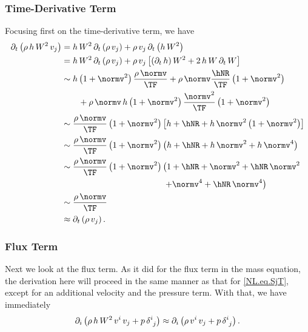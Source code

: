 \subsubsection{Time-Derivative Term}
Focusing first on the time-derivative term, we have
\begin{align}
  \p_{t}\left(\rho\,h\,W^{2}\,v_{j}\right)
  &=h\,W^{2}\,\p_{t}\left(\rho\,v_{j}\right)
  +\rho\,v_{j}\,\p_{t}\left(h\,W^{2}\right) \\
  &=h\,W^{2}\,\p_{t}\left(\rho\,v_{j}\right)
  +\rho\,v_{j}\left[\left(\p_{t}\,h\right)W^{2}+2\,h\,W\,\p_{t}\,W\right] \\
  &\sim h\left(1+\normv^{2}\right)\frac{\rho\,\normv}{\TF}
  +\rho\,\normv\frac{\hNR}{\TF}\left(1+\normv^{2}\right) \notag \\
  &\hspace{2em}+\rho\,\normv\,h\left(1+\normv^{2}\right)
  \frac{\normv^{2}}{\TF}\left(1+\normv^{2}\right) \\
  &\sim\frac{\rho\,\normv}{\TF}\left(1+\normv^{2}\right)
  \left[h+\hNR+h\,\normv^{2}\left(1+\normv^{2}\right)\right] \\
  &\sim\frac{\rho\,\normv}{\TF}\left(1+\normv^{2}\right)
  \left(h+\hNR+h\,\normv^{2}+h\,\normv^{4}\right) \\
  &\sim\frac{\rho\,\normv}{\TF}\left(1+\normv^{2}\right)
  \left(1+\hNR+\normv^{2}+\hNR\,\normv^{2}\right. \notag \\
  &\left.\hspace{12em}+\normv^{4}+\hNR\,\normv^{4}\right) \\
  &\sim\frac{\rho\,\normv}{\TF} \\
  &\approx\p_{t}\left(\rho\,v_{j}\right).
  \label{NL.eq.SjT}
\end{align}

\subsubsection{Flux Term}
Next we look at the flux term.
As it did for the flux term in the mass equation,
the derivation here will proceed in the same manner as that
for \eqref{NL.eq.SjT},
except for an additional velocity and the pressure term.
With that, we have immediately
\begin{equation}
  \partial_{i}\left(\rho\,h\,W^{2}\,v^{i}\,v_{j}+p\,\delta^{i}_{~j}\right)
  \approx\partial_{i}\left(\rho\,v^{i}\,v_{j}+p\,\delta^{i}_{~j}\right).
\end{equation}

